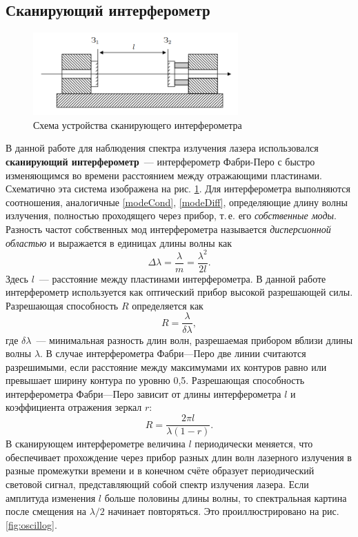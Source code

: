 \documentclass[a4paper,12pt]{article} %
\begin{document}
\subsection*{Сканирующий интерферометр}
\begin{figure}[h]
    \centering
    \includegraphics[width=0.7\textwidth]{scanner.png}
    \caption{Схема устройства сканирующего интерферометра}
    \label{fig:scanner}
\end{figure}
В данной работе для наблюдения спектра излучения лазера использовался \textbf{сканирующий интерферометр}~--- интерферометр Фабри-Перо с быстро изменяющимся во времени расстоянием между отражающими пластинами. Схематично эта система изображена на рис. \ref{fig:scanner}. Для интерферометра выполняются соотношения, аналогичные \eqref{modeCond}, \eqref{modeDiff}, определяющие длину волны излучения, полностью проходящего через прибор, т.\,е. его \textit{собственные моды}. Разность частот собственных мод интерферометра называется \textit{дисперсионной областью} и выражается в единицах длины волны как
\begin{equation}
    \Delta\lambda = \frac{\lambda}{m} = \frac{\lambda^2}{2l}.
\end{equation}
Здесь $l$~--- расстояние между пластинами интерферометра. В данной работе интерферометр используется как оптический прибор высокой разрешающей силы. Разрешающая способность $R$ определяется как
\begin{equation}
    \label{eq:R}
    R = \frac{\lambda}{\delta\lambda},
\end{equation}
где $\delta\lambda$~--- минимальная разность длин волн, разрешаемая прибором вблизи длины волны $\lambda$. В случае интерферометра Фабри—Перо две линии считаются разрешимыми, если расстояние между максимумами их контуров равно или превышает ширину контура по уровню 0,5. Разрешающая способность интерферометра Фабри—Перо зависит от длины интерферометра $l$ и коэффициента отражения зеркал $r$:
\begin{equation} \label{eq:R_r}
    R = \frac{2\pi l}{\lambda(1-r)}.
\end{equation}
В сканирующем интерферометре величина $l$ периодически меняется, что обеспечивает прохождение через прибор разных длин волн лазерного излучения в разные промежутки времени и в конечном счёте образует периодический световой сигнал, представляющий собой спектр излучения лазера. Если амплитуда изменения $l$ больше половины длины волны, то спектральная картина после смещения на $\lambda/2$ начинает повторяться. Это проиллюстрировано на рис. \ref{fig:oscillog}.
\end{document}
